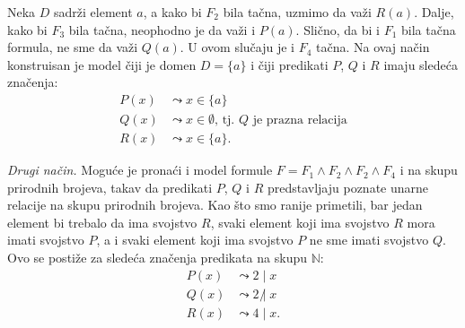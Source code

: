 {{Neka $D$ sadr\v zi element $a$, a kako bi $F_2$ bila ta\v cna, uzmimo da va\v zi $R(a)$. Dalje, kako bi $F_3$ bila ta\v cna, neophodno je da va\v zi i $P(a)$. Sli\v cno, da bi i $F_1$ bila ta\v cna formula, ne sme da va\v zi $Q(a)$. U ovom slu\v caju je i $F_4$ ta\v cna. Na ovaj na\v cin konstruisan je model \v ciji je domen $D=\{a\}$ i \v ciji predikati $P$, $Q$ i $R$ imaju slede\' ca zna\v cenja:
\begin{align*}
P(x)&\leadsto x\in\{a\}\\
Q(x)&\leadsto x\in\emptyset\text{, tj. }Q\text{ je prazna relacija}\\
R(x)&\leadsto x\in\{a\}.
\end{align*}

{\it Drugi na\v cin.} Mogu\' ce je prona\' ci i model formule $F=F_1\wedge F_2\wedge F_2\wedge F_4$ i na skupu prirodnih brojeva, takav da predikati $P$, $Q$ i $R$ predstavljaju poznate unarne relacije na skupu prirodnih brojeva. Kao \v sto smo ranije primetili, bar jedan element bi trebalo da ima svojstvo $R$, svaki element koji ima svojstvo $R$ mora imati svojstvo $P$, a i svaki element koji ima svojstvo $P$ ne sme imati svojstvo $Q$. Ovo se posti\v ze za slede\' ca zna\v cenja predikata na skupu $\mathbb N$:
\begin{align*}
P(x)&\leadsto 2\mid x\\
Q(x)&\leadsto 2\mathrel{\not|} x\\
R(x)&\leadsto 4\mid x.
\end{align*}
}

}
